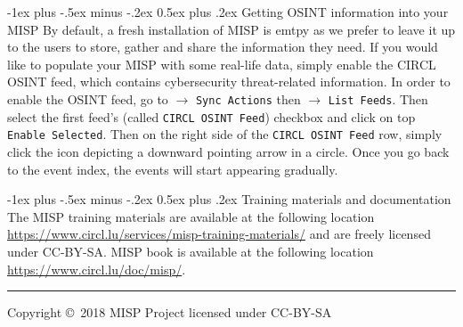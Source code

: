 \documentclass[10pt,landscape]{article}
\makeatletter
\renewcommand{\section}{\@startsection{section}{1}{0mm}%
                                {-1ex plus -.5ex minus -.2ex}%
                                {0.5ex plus .2ex}%
                                {\normalfont\large\bfseries}}
\makeatother
\begin{document}
\begin{multicols}{3}
        \section{Getting OSINT information into your MISP}
        By default, a fresh installation of MISP is emtpy as we prefer to leave it up to the users to store, gather and share the information they need. If you would like to populate your MISP with some real-life data, simply enable the CIRCL OSINT feed, which contains cybersecurity threat-related information. In order to enable the OSINT feed, go to $\rightarrow$ {\tt Sync Actions} then $\rightarrow$ {\tt List Feeds}. Then select the first feed's (called {\tt CIRCL OSINT Feed}) checkbox and click on top {\tt Enable Selected}. Then on the right side of the {\tt CIRCL OSINT Feed} row, simply click the icon depicting a downward pointing arrow in a circle. Once you go back to the event index, the events will start appearing gradually.

\section{Training materials and documentation}
        The MISP training materials are available at the following location \url{https://www.circl.lu/services/misp-training-materials/} and are freely licensed under CC-BY-SA.
        MISP book is available at the following location \url{https://www.circl.lu/doc/misp/}.


\rule{0.3\linewidth}{0.25pt}
\scriptsize

Copyright \copyright\ 2018 MISP Project licensed under CC-BY-SA

\end{multicols}
\end{document}
